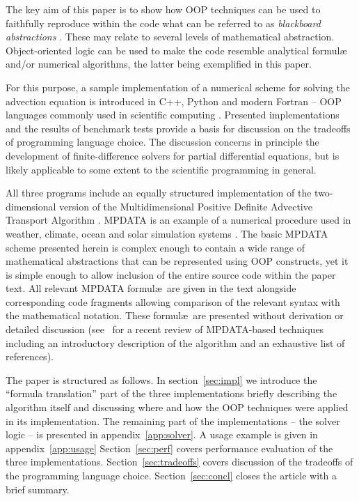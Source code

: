 \documentclass[twocolumn]{article}
\newcommand{\changed}[1]{#1}
\begin{document}
  The key aim of this paper is to show how OOP techniques can be used to faithfully
    reproduce within the code what can be referred to as {\em blackboard abstractions} \citep{Rouson_et_al_2012}.
  \changed{These may relate to several levels of mathematical abstraction. 
    Object-oriented logic can be used to make the code resemble analytical formul\ae~\citep[e.g.][]{Weller_et_al_1998}
    and/or numerical algorithms, the latter being exemplified in this paper.
    }
  For this purpose, a sample implementation of a numerical scheme for solving
    the advection equation is introduced in C++, Python and modern Fortran --
    OOP languages commonly used in scientific computing \citep[see e.g.][chapt.~8]{Einarsson_2005}. 
  Presented implementations and the results of benchmark tests
    provide a basis for discussion on the tradeoffs of programming language choice.
  The discussion concerns in principle the development of finite-difference solvers for 
    partial differential equations, but is likely applicable to some extent to the scientific programming in general.

  All three programs include an equally structured implementation of the two-dimensional version of the 
    Multidimensional Positive Definite Advective Transport Algorithm \citep[MPDATA;][]{Smolarkiewicz_1984}.
  MPDATA is an example of a numerical procedure used in weather, climate, ocean and solar simulation systems
    \citep[e.g.][respectively]{Ziemianski_et_al_2011,Abiodun_et_al_2011,Ezer_et_al_2002,Charbonneau_and_Smolarkiewicz_2013}.
  The basic MPDATA scheme presented herein is complex enough to contain
    a wide range of mathematical abstractions that can be represented using OOP constructs, 
    yet it is simple enough to allow inclusion of the entire source code within the paper text.
  All relevant MPDATA formul\ae~are given in the text alongside corresponding code fragments
    allowing comparison of the relevant syntax with the mathematical notation.
  These formul\ae~are presented without derivation or detailed discussion
    (see~\citep{Smolarkiewicz_2006} for a recent review of MPDATA-based techniques including an introductory description 
    of the algorithm and an exhaustive list of references).

  The paper is structured as follows.
  In section~\ref{sec:impl} we introduce the ``formula translation'' part of the three implementations
    briefly describing the algorithm itself and
    discussing where and how the OOP techniques were applied in its implementation.
  The remaining part of the implementations -- the solver logic -- is
    presented in appendix~\ref{app:solver}.
  A usage example is given in appendix~\ref{app:usage}
  Section~\ref{sec:perf} covers performance evaluation of the three implementations.
  Section~\ref{sec:tradeoffs} covers discussion of the tradeoffs of the programming language choice.
  Section~\ref{sec:concl} closes the article with a brief summary.
\end{document}
